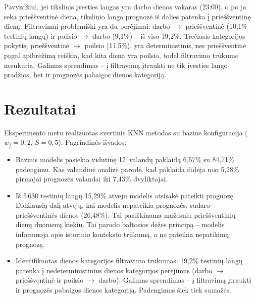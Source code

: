 \documentclass[]{VUMIFTemplateClass}
\begin{document}
    Pavyzdžiui, jei tikslinis įvesties langas yra darbo dienos vakaras (23:00), o po jo seka prieššventinė diena, tikslinio lango prognozė iš dalies patenka į prieššventinę dieną.
    Filtravimui problemiški yra du perėjimai: darbo $\to$ prieššventinė (10,1\% testinių langų) ir poilsio $\to$ darbo (9,1\%) -- iš viso 19,2\%.
    Trečiasis kategorijos pokytis, prieššventinė $\to$ poilsio (11,5\%), yra deterministinis, nes prieššventinė pagal apibrėžimą reiškia, kad kita diena yra poilsio, todėl filtravimo trūkumo nesukuria.
    Galimas sprendimas -- į filtravimą įtraukti ne tik įvesties lango pradžios, bet ir prognozės pabaigos dienos kategoriją.


    \section{Rezultatai}

    Eksperimento metu realizuotas svertinis KNN metodas su bazine konfigūracija ($w_j = 0{,}2$, $S = 0{,}5$).
    Pagrindinės išvados:

    \begin{itemize}
        \item Bazinis modelis pasiekia vidutinę 12~valandų paklaidą 6,57\% su 84,71\% padengimu.
        Kas valandinė analizė parodė, kad paklaida didėja nuo 5,28\% pirmajai prognozės valandai iki 7,43\% dvyliktajai.

        \item Iš 5\,630 testinių langų 15,29\% atveju modelis atsisakė pateikti prognozę.
        Didžiausią dalį atvejų, kai modelis nepateikia prognozės, sudaro prieššventinės dienos (26,48\%). Tai paaiškinama mažesniu prieššventinių dienų duomenų kiekiu.
        Tai parodo baltosios dėžės principą -- modelis informuoja apie istorinio konteksto trūkumą, o ne pateikia nepatikimą prognozę.

        \item Identifikuotas dienos kategorijos filtravimo trūkumas: 19,2\% testinių langų patenka į nedeterministinius dienos kategorijos perėjimus (darbo $\to$ prieššventinė ir poilsio $\to$ darbo). Galimas sprendimas -- į filtravimą įtraukti ir prognozės pabaigos dienos kategoriją. Padengimas šiek tiek sumažės.
    \end{itemize}
\end{document}
